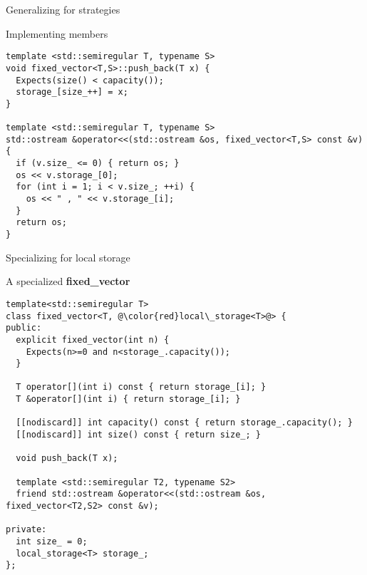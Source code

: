 \begin{frame}[t,fragile]{Generalizing for strategies}
\begin{block}{Implementing members}
\begin{lstlisting}
template <std::semiregular T, typename S>
void fixed_vector<T,S>::push_back(T x) {
  Expects(size() < capacity());
  storage_[size_++] = x;
}

template <std::semiregular T, typename S>
std::ostream &operator<<(std::ostream &os, fixed_vector<T,S> const &v) {
  if (v.size_ <= 0) { return os; }
  os << v.storage_[0];
  for (int i = 1; i < v.size_; ++i) {
    os << " , " << v.storage_[i];
  }
  return os;
}
\end{lstlisting}
\end{block}
\end{frame}

\begin{frame}[t,fragile,shrink=10]{Specializing for local storage}
\begin{block}{A specialized \textbf{fixed\_vector}}
\begin{lstlisting}[escapechar=@]
template<std::semiregular T>
class fixed_vector<T, @\color{red}local\_storage<T>@> {
public:
  explicit fixed_vector(int n) {
    Expects(n>=0 and n<storage_.capacity());
  }

  T operator[](int i) const { return storage_[i]; }
  T &operator[](int i) { return storage_[i]; }

  [[nodiscard]] int capacity() const { return storage_.capacity(); }
  [[nodiscard]] int size() const { return size_; }

  void push_back(T x);

  template <std::semiregular T2, typename S2>
  friend std::ostream &operator<<(std::ostream &os, fixed_vector<T2,S2> const &v);

private:
  int size_ = 0;
  local_storage<T> storage_;
};

\end{lstlisting}
\end{block}
\end{frame}
